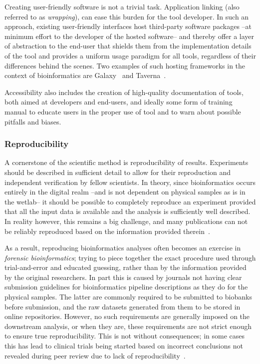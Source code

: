 \begin{justify}
Creating user-friendly software is not a trivial task. Application linking (also referred to as \emph{wrapping}), can ease this burden for the tool developer. In such an approach, existing user-friendly interfaces host third-party software packages --at minimum effort to the developer of the hosted software-- and thereby offer a layer of abstraction to the end-user that shields them from the implementation details of the tool and provides a uniform usage paradigm for all tools, regardless of their differences behind the scenes. Two examples of such hosting frameworks in the context of bioinformatics are Galaxy~\cite{giardine2005galaxy,goecks2010galaxy} and Taverna~\cite{oinn2004taverna}.

Accessibility also includes the creation of high-quality documentation of tools, both aimed at developers and end-users, and ideally some form of training manual to educate users in the proper use of tool and to warn about possible pitfalls and biases.

\subsubsection{Reproducibility}

A cornerstone of the scientific method is reproducibility of results. Experiments should be described in sufficient detail to allow for their reproduction and independent verification by fellow scientists. In theory, since bioinformatics occurs entirely in the digital realm --and is not dependent on physical samples as is in the wetlab-- it should be possible to completely reproduce an experiment provided that all the input data is available and the analysis is sufficiently well described. In reality however, this remains a big challenge, and many publications can not be reliably reproduced based on the information provided therein~\cite{baggerly2009reproducible,kim2018reproducibility}.

As a result, reproducing bioinformatics analyses often becomes an exercise in \textit{forensic bioinformatics}; trying to piece together the exact procedure used through trial-and-error and educated guessing, rather than by the information provided by the original researchers. In part this is caused by journals not having clear submission guidelines for bioinformatics pipeline descriptions as they do for the physical samples. The latter are commonly required to be submitted to biobanks before submission, and the raw datasets generated from them to be stored in online repositories. However, no such requirements are generally imposed on the downstream analysis, or when they are, these requirements are not strict enough to ensure true reproducibility. This is not without consequences; in some cases this has lead to clinical trials being started based on incorrect conclusions not revealed during peer review due to lack of reproducibility~\cite{baggerly2009reproducible}.


\end{justify}
